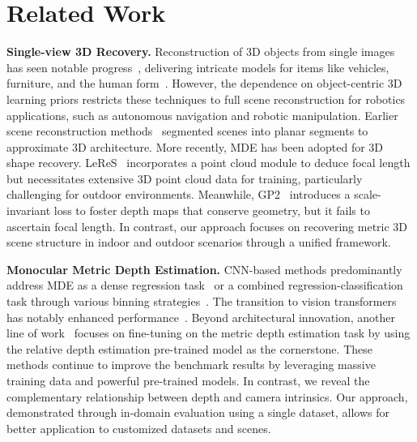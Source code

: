 \section{Related Work}
\textbf{Single-view 3D Recovery.}
Reconstruction of 3D objects from single images has seen notable progress~\cite{barron2014shape,wang2018pixel2mesh,wu2018learning,popov2020corenet}, delivering intricate models for items like vehicles, furniture, and the human form~\cite{saito2019pifu,saito2020pifuhd}. However, the dependence on object-centric 3D learning priors restricts these techniques to full scene reconstruction for robotics applications, such as autonomous navigation and robotic manipulation. Earlier scene reconstruction methods~\cite{saxena2008make3d} segmented scenes into planar segments to approximate 3D architecture. More recently, MDE has been adopted for 3D shape recovery. LeReS~\cite{yin2021learning} incorporates a point cloud module to deduce focal length but necessitates extensive 3D point cloud data for training, particularly challenging for outdoor environments. Meanwhile, GP2~\cite{patakin2022single} introduces a scale-invariant loss to foster depth maps that conserve geometry, but it fails to ascertain focal length. In contrast, our approach focuses on recovering metric 3D scene structure in indoor and outdoor scenarios through a unified framework.

\textbf{Monocular Metric Depth Estimation.}
CNN-based methods predominantly address MDE as a dense regression task~\cite{eigen2014depth,yuan2022neural,liu2023va,piccinelli2023idisc} or a combined regression-classification task through various binning strategies~\cite{adabins,binsformer,localbins,iebins}. The transition to vision transformers has notably enhanced performance~\cite{yang2021transformer,ranftl2021vision,li2023depthformer}. 
Beyond architectural innovation, another line of work~\cite{bhat2023zoedepth,guizilini2023towards,depthanything} focuses on fine-tuning on the metric depth estimation task by using the relative depth estimation pre-trained model as the cornerstone. These methods continue to improve the benchmark results by leveraging massive training data and powerful pre-trained models. In contrast, we reveal the complementary relationship between depth and camera intrinsics. Our approach, demonstrated through in-domain evaluation using a single dataset, allows for better application to customized datasets and scenes.



